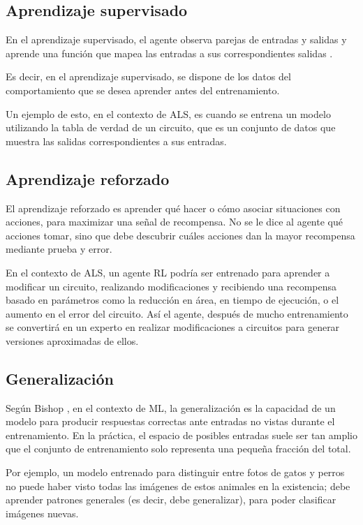 \subsection{Aprendizaje supervisado}

En el aprendizaje supervisado, el agente observa parejas de entradas y salidas
y aprende una función que mapea las entradas a sus correspondientes salidas
\cite{russell2016artificial}.

Es decir, en el aprendizaje supervisado, se dispone de los datos del
comportamiento que se desea aprender antes del entrenamiento.

Un ejemplo de esto, en el contexto de ALS, es cuando se entrena un modelo
utilizando la tabla de verdad de un circuito, que es un conjunto de datos que
muestra las salidas correspondientes a sus entradas.

\subsection{Aprendizaje reforzado}

El aprendizaje reforzado es aprender qué hacer o cómo asociar situaciones con
acciones, para maximizar una señal de recompensa. No se le dice al agente qué
acciones tomar, sino que debe descubrir cuáles acciones dan la mayor recompensa
mediante prueba y error. \cite{sutton_reinforcement_2018}

En el contexto de ALS, un agente RL podría ser entrenado para aprender a
modificar un circuito, realizando modificaciones y recibiendo una recompensa
basado en parámetros como la reducción en área, en tiempo de ejecución, o el
aumento en el error del circuito. Así el agente, después de mucho entrenamiento
se convertirá en un experto en realizar modificaciones a circuitos para generar
versiones aproximadas de ellos.

\subsection{Generalización}

Según Bishop \cite{bishop_pattern_2006}, en el contexto de ML, la
generalización es la capacidad de un modelo para producir respuestas correctas
ante entradas no vistas durante el entrenamiento. En la práctica, el espacio de
posibles entradas suele ser tan amplio que el conjunto de entrenamiento solo
representa una pequeña fracción del total.

Por ejemplo, un modelo entrenado para distinguir entre fotos de gatos y perros
no puede haber visto todas las imágenes de estos animales en la existencia;
debe aprender patrones generales (es decir, debe generalizar), para poder
clasificar imágenes nuevas.

